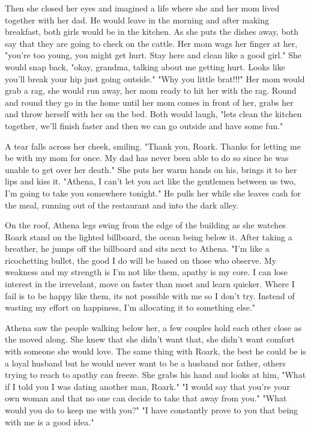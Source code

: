         Then she closed her eyes and imagined a life where she and her mom lived together with her dad. He would leave in the morning and after
    making breakfast, both girls would be in the kitchen. As she puts the dishes away, both say that they are going to check on the cattle. 
    Her mom wags her finger at her, "you're too young, you might get hurt. Stay here and clean like a good girl." She would snap back, "okay,
    grandma, talking about me getting hurt. Looks like you'll break your hip just going outside." "Why you little brat!!!" Her mom would grab
    a rag, she would run away, her mom ready to hit her with the rag. Round and round they go in the home until her mom comes in front of her,
    grabs her and throw herself with her on the bed. Both would laugh, "lets clean the kitchen together, we'll finish faster and then we can
    go outside and have some fun."

        A tear falls across her cheek, smiling. "Thank you, Roark. Thanks for letting me be with my mom for once. My dad has never been able
    to do so since he was unable to get over her death." She puts her warm hands on his, brings it to her lips and kiss it. "Athena, I can't
    let you act like the gentlemen between us two, I'm going to take you somewhere tonight." He pulls her while she leaves cash for the meal,
    running out of the restaurant and into the dark alley.

        On the roof, Athena legs swing from the edge of the building as she watches Roark stand on the lighted billboard, the ocean being below
    it. After taking a breather, he jumps off the billboard and sits next to Athena. "I'm like a ricochetting bullet, the good I do will be
    based on those who observe. My weakness and my strength is I'm not like them, apathy is my core. I can lose interest in the irrevelant, move
    on faster than most and learn quicker. Where I fail is to be happy like them, its not possible with me so I don't try. Instead of wasting
    my effort on happiness, I'm allocating it to something else."

        Athena saw the people walking below her, a few couples hold each other close as the moved along. She knew that she didn't want that,
    she didn't want comfort with someone she would love. The same thing with Roark, the best he could be is a loyal husband but he would never
    want to be a husband nor father, others trying to reach to apathy can freeze. She grabs his hand and looks at him, "What if I told you I
    was dating another man, Roark." "I would say that you're your own woman and that no one can decide to take that away from you." "What would
    you do to keep me with you?" "I have constantly prove to you that being with me is a good idea."

